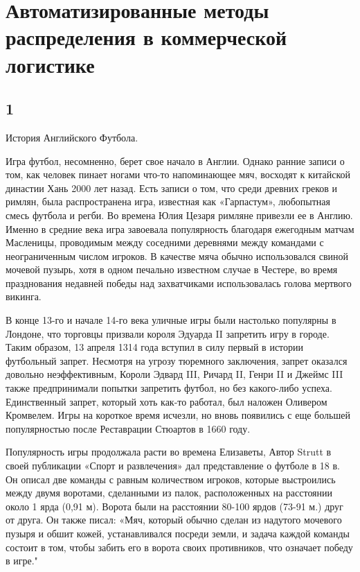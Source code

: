 \section{Автоматизированные методы распределения в коммерческой логистике}
\subsection{1}
История Английского Футбола. 

Игра футбол, несомненно, берет свое начало в Англии. Однако ранние записи о том, как человек пинает ногами что-то напоминающее мяч, восходят к китайской династии Хань 2000 лет назад. Есть записи о том, что среди древних греков и римлян, была распространена игра, известная как «Гарпастум», любопытная смесь футбола и регби. Во времена Юлия Цезаря римляне привезли ее в Англию. Именно в средние века игра завоевала популярность благодаря ежегодным матчам Масленицы, проводимым между соседними деревнями между командами с неограниченным числом игроков. В качестве мяча обычно использовался свиной мочевой пузырь, хотя в одном печально известном случае в Честере, во время празднования недавней победы над захватчиками использовалась голова мертвого викинга.

В конце 13-го и начале 14-го века уличные игры были настолько популярны в Лондоне, что торговцы призвали короля Эдуарда II запретить игру в городе.  Таким образом, 13 апреля 1314 года вступил в силу первый в истории футбольный запрет. Несмотря на угрозу тюремного заключения, запрет оказался довольно неэффективным, Короли Эдвард III, Ричард II, Генри II и Джеймс III также предпринимали попытки запретить футбол, но без какого-либо успеха. Единственный запрет, который хоть как-то работал, был наложен Оливером Кромвелем. Игры на короткое время исчезли, но вновь появились с еще большей популярностью после Реставрации Стюартов в 1660 году.

Популярность игры продолжала расти во времена Елизаветы, Автор Strutt в своей публикации «Спорт и развлечения» дал представление о футболе в 18 в. Он описал две команды с равным количеством игроков, которые выстроились между двумя воротами, сделанными из палок, расположенных на расстоянии около 1 ярда (0,91 м). Ворота были на расстоянии 80-100 ярдов (73-91 м.) друг от друга. Он также писал: «Мяч, который обычно сделан из надутого мочевого пузыря и обшит кожей, устанавливался посреди земли, и задача каждой команды состоит в том, чтобы забить его в ворота своих противников, что означает победу в игре."

